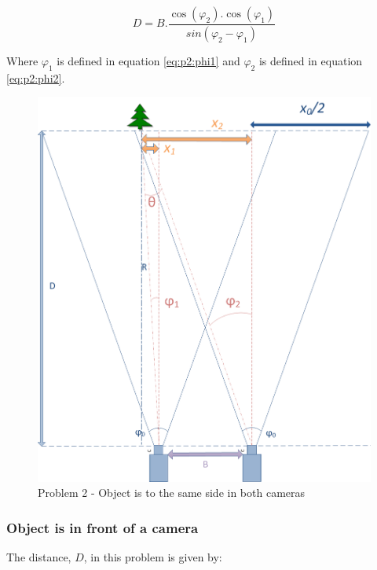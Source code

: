 \begin{equation} \label{eq:p2:DeqB}
D = B.\frac{\cos(\varphi_2).\cos(\varphi_1)}{sin(\varphi_2 - \varphi_1)}
\end{equation}

Where $\varphi_1$ is defined in equation \eqref{eq:p2:phi1} and $\varphi_2$ is defined in equation \eqref{eq:p2:phi2}. 

\begin{figure}
\includegraphics[width=\textwidth,height=\textheight,keepaspectratio]{Figures/problem2.png}
\caption{Problem 2 - Object is to the same side in both cameras}
\label{problem_toleft}
\end{figure}

\subsubsection{Object is in front of a camera}
The distance, $D$, in this problem is given by:


